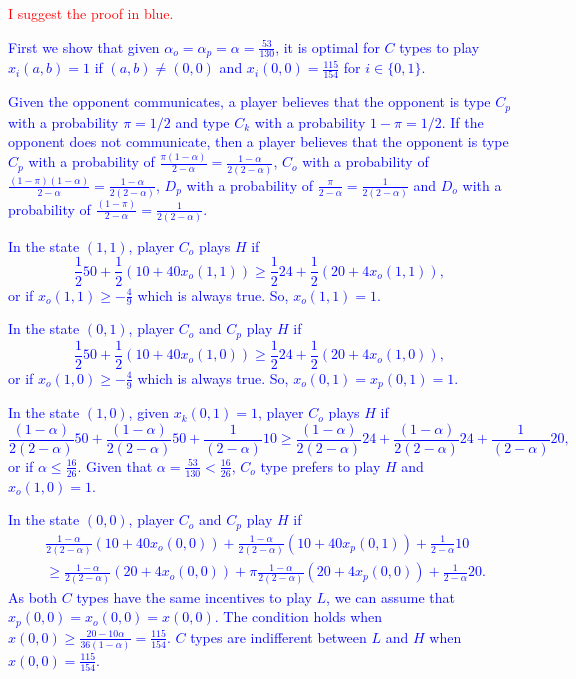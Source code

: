 \documentclass[12pt]{article}
\theoremstyle{break}
\begin{document}
\textcolor{red}{I suggest the proof in blue.}

\textcolor{blue}{First we show that given $\alpha_o=\alpha_p=\alpha=\frac{53}{130}$, it is optimal for $C$ types to play $x_i(a,b)=1$ if $(a,b)\neq (0,0)$ and $x_i(0,0)=\frac{115}{154}$ for $i\in\{0,1\}$.}

\textcolor{blue}{Given the opponent communicates, a player believes that the opponent is type $C_p$ with a probability $\pi=1/2$ and type $C_k$ with a probability $1-\pi=1/2$. If the opponent does not communicate, then a player believes that the opponent is type $C_p$ with a probability of $\frac{\pi (1-\alpha)}{2-\alpha}=\frac{1-\alpha}{2(2-\alpha)}$, $C_o$ with a probability of $\frac{(1-\pi) (1-\alpha)}{2-\alpha}=\frac{1-\alpha}{2(2-\alpha)}$, $D_p$ with a probability of $\frac{\pi }{2-\alpha}=\frac{1}{2(2-\alpha)}$ and $D_o$ with a probability of $\frac{(1-\pi) }{2-\alpha}=\frac{1}{2(2-\alpha)}$.}

\textcolor{blue}{In the state $(1,1)$, player $C_o$ plays $H$ if $$ \frac{1}{2} 50 + \frac{1}{2} (10+40x_o(1,1))\geq \frac{1}{2} 24 + \frac{1}{2} (20+4x_o(1,1)), $$ or if $x_o(1,1)\geq -\frac{4}{9}$ which is always true. So, $x_o(1,1)=1$.}

\textcolor{blue}{In the state $(0,1)$, player $C_o$ and $C_p$ play $H$ if $$ \frac{1}{2} 50 + \frac{1}{2} (10+40x_o(1,0))\geq \frac{1}{2} 24 + \frac{1}{2} (20+4x_o(1,0)), $$ or if $x_o(1,0)\geq -\frac{4}{9}$ which is always true. So, $x_o(0,1)=x_p(0,1)=1$.}

\textcolor{blue}{In the state $(1,0)$, given $x_k(0,1)=1$, player $C_o$ plays $H$ if $$ \frac{(1-\alpha)}{2(2-\alpha)} 50 + \frac{(1-\alpha)}{2(2-\alpha)} 50 + \frac{1}{(2-\alpha)} 10 \geq \frac{(1-\alpha)}{2(2-\alpha)} 24 + \frac{(1-\alpha)}{2(2-\alpha)} 24 + \frac{1}{(2-\alpha)} 20, $$ or if $\alpha \leq \frac{16}{26}$. Given that $\alpha=\frac{53}{130}<\frac{16}{26}$, $C_o$ type prefers to play $H$ and $x_o(1,0)=1$.}

\textcolor{blue}{In the state $(0,0)$, player $C_o$ and $C_p$ play $H$ if
\begin{align*}
	&\frac{1-\alpha}{2(2-\alpha)} (10+40x_o(0,0))+ \frac{1-\alpha}{2(2-\alpha)}(10+40 x_p(0,1))+\frac{1}{2-\alpha}10\\
		&\geq \frac{1-\alpha}{2(2-\alpha)} (20+4x_o(0,0))+\pi \frac{1-\alpha}{2(2-\alpha)}(20+4 x_p(0,0)) +\frac{1}{2-\alpha}20.
\end{align*}
As both $C$ types have the same incentives to play $L$, we can assume that $x_p(0,0)=x_o(0,0)=x(0,0)$. The condition holds when $x(0,0)\geq \frac{20-10\alpha}{36(1-\alpha)}=\frac{115}{154}$. $C$ types are indifferent between $L$ and $H$ when $x(0,0)=\frac{115}{154}$.}
\end{document}
